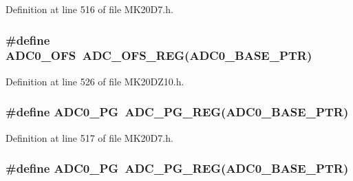 Definition at line 516 of file M\+K20\+D7.\+h.

\subsubsection[{\texorpdfstring{A\+D\+C0\+\_\+\+O\+FS}{ADC0_OFS}}]{\setlength{\rightskip}{0pt plus 5cm}\#define A\+D\+C0\+\_\+\+O\+FS~{\bf A\+D\+C\+\_\+\+O\+F\+S\+\_\+\+R\+EG}({\bf A\+D\+C0\+\_\+\+B\+A\+S\+E\+\_\+\+P\+TR})}\hypertarget{group___a_d_c___register___accessor___macros_gafc3e937b7e7ee72630397b81944464b5}{}\label{group___a_d_c___register___accessor___macros_gafc3e937b7e7ee72630397b81944464b5}


Definition at line 526 of file M\+K20\+D\+Z10.\+h.

\subsubsection[{\texorpdfstring{A\+D\+C0\+\_\+\+PG}{ADC0_PG}}]{\setlength{\rightskip}{0pt plus 5cm}\#define A\+D\+C0\+\_\+\+PG~{\bf A\+D\+C\+\_\+\+P\+G\+\_\+\+R\+EG}({\bf A\+D\+C0\+\_\+\+B\+A\+S\+E\+\_\+\+P\+TR})}\hypertarget{group___a_d_c___register___accessor___macros_ga339951b4f192bd4558b3ddfb0af8fefb}{}\label{group___a_d_c___register___accessor___macros_ga339951b4f192bd4558b3ddfb0af8fefb}


Definition at line 517 of file M\+K20\+D7.\+h.

\subsubsection[{\texorpdfstring{A\+D\+C0\+\_\+\+PG}{ADC0_PG}}]{\setlength{\rightskip}{0pt plus 5cm}\#define A\+D\+C0\+\_\+\+PG~{\bf A\+D\+C\+\_\+\+P\+G\+\_\+\+R\+EG}({\bf A\+D\+C0\+\_\+\+B\+A\+S\+E\+\_\+\+P\+TR})}\hypertarget{group___a_d_c___register___accessor___macros_ga339951b4f192bd4558b3ddfb0af8fefb}{}\label{group___a_d_c___register___accessor___macros_ga339951b4f192bd4558b3ddfb0af8fefb}


